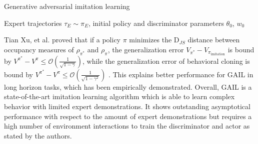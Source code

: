 \begin{algorithm}
    \caption{Generative adversarial imitation learning}
    \label{GAIL_Algo}
    \begin{algorithmic}
    \Require Expert trajectories $\tau_E \sim \pi_E$, initial policy and discriminator parameters $\theta_0$, $w_0$\\
    \end{algorithmic}
    \end{algorithm}
Tian Xu, et al. proved that if a policy $\pi$ minimizes the $\text{D}_{JS}$ distance 
between occupancy measures of $\rho_{\pi^*}$ and $\rho_{\pi}$, the generalization error $V_{\pi^*} - V_{\pi_{\text{imitation}}}$ is bound by 
$V^{{\pi^*}} - V^{\pi} \leq \mathcal{O}\left(\frac{1}{\sqrt{1-\gamma}}\right)$, while the generalization error of behavioral cloning is bound by 
$V^{{\pi^*}} - V^{\pi} \leq \mathcal{O}\left(\frac{1}{\sqrt{1-\gamma^2}}\right)$ \cite{NEURIPS2020_b5c01503} . This explains better performance for GAIL in long horizon tasks, which has 
been empirically demonstrated. Overall, GAIL is a state-of-the-art imitation learning algorithm which is able to learn complex behavior with limited expert demonstrations. It shows outstanding 
asymptotical performance with respect to the amount of expert demonstrations but requires a high number of environment interactions to train the discriminator and actor as stated by the authors. 

